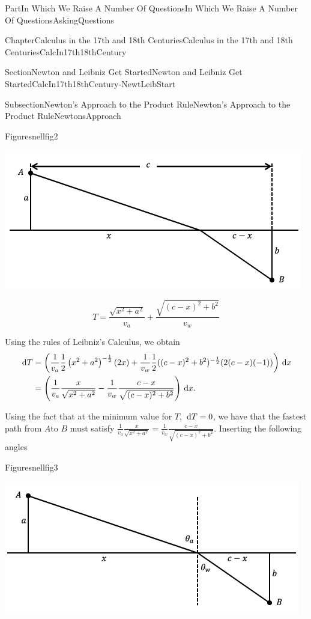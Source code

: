 \documentclass[oneside,10pt,]{book}
\numberwithin{equation}{part}
\newcommand{\dx}[1]{\,{\rm d}#1}
\newcommand{\amp}{&}
\begin{document}
\begin{partptx}{Part}{In Which We Raise A Number Of Questions}{}{In Which We Raise A Number Of Questions}{}{}{AskingQuestions}
\begin{chapterptx}{Chapter}{Calculus in the 17th and 18th Centuries}{}{Calculus in the 17th and 18th Centuries}{}{}{CalcIn17th18thCentury}
\begin{sectionptx}{Section}{Newton and Leibniz Get Started}{}{Newton and Leibniz Get Started}{}{}{CalcIn17th18thCentury-NewtLeibStart}
\begin{subsectionptx}{Subsection}{Newton's Approach to the Product Rule}{}{Newton's Approach to the Product Rule}{}{}{NewtonsApproach}
\begin{figureptx}{Figure}{}{snellfig2}{}
\begin{image}{0.125}{0.75}{0.125}{}%
\includegraphics[width=\linewidth]{external/images/snellfig2.png}
\end{image}%
\tcblower
\end{figureptx}%
%
\begin{equation*}
T=\frac{\sqrt{x^2+a^2}}{v_a}+\frac{\sqrt{(c-x)^2+b^2}}{v_w}
\end{equation*}
%
\par
Using the rules of Leibniz's Calculus, we obtain%
\begin{align*}
\dx{ T}\amp = \left(\frac{1}{v_a}\frac{1}{2}\left(x^2+a^2\right)^{-\frac{1}{2}} (2x)+\frac{1}{v_w}\frac{1}{2}((c-x)^2+b^2)^{-\frac{1}{2}}(2(c-x)(-1))\right) \dx{ x}\\
\amp =\left(\frac{1}{v_a}\frac{x}{\sqrt{x^2+a^2}}-\frac{1}{v_w}\frac{c-x}{\sqrt{(c-x)^2+b^2}}\right)\dx{ x}\text{.}
\end{align*}
%
\par
Using the fact that at the minimum value for \(T\), \(\dx{ T}=0\), we have that the fastest path from \(A\)to \(B\) must satisfy \(\frac{1}{v_a}\frac{x}{\sqrt{x^2+a^2}}=\frac{1}{v_w}\frac{c-x}{\sqrt{(c-x)^2+b^2}}\). Inserting the following angles%
\begin{figureptx}{Figure}{}{snellfig3}{}%
\begin{image}{0.125}{0.75}{0.125}{}%
\includegraphics[width=\linewidth]{external/images/snellfig3.png}

\end{image}
\end{figureptx}
\end{subsectionptx}
\end{sectionptx}
\end{chapterptx}
\end{partptx}
\end{document}
